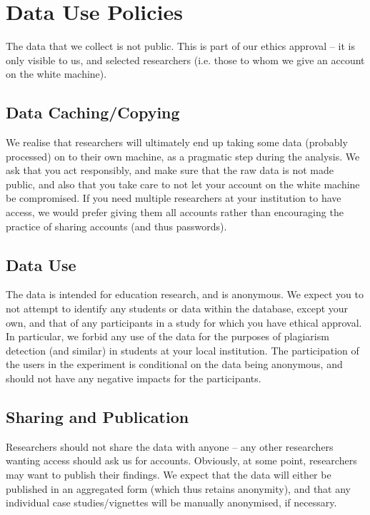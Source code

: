 \documentclass{report}
\begin{document}
\chapter{Data Use Policies}
\label{sec:data_use}

The data that we collect is not public.  This is part of our ethics approval
-- it is only visible to us, and selected researchers (i.e. those to whom we
give an account on the white machine).  

\section{Data Caching/Copying}

We realise that researchers will ultimately end up taking some data (probably
processed) on to their own machine, as a pragmatic step during the analysis.
We ask that you act responsibly, and make sure that the raw data is not made
public, and also that you take care to not let your account on the white
machine be compromised.  If you need multiple researchers at your institution
to have access, we would prefer giving them all accounts rather than
encouraging the practice of sharing accounts (and thus passwords).


\section{Data Use}

The data is intended for education research, and is anonymous.  We expect you
to not attempt to identify any students or data within the database, except
your own, and that of any participants in a study for which you have ethical
approval.  In particular, we forbid any use of the data for the purposes of
plagiarism detection (and similar) in students at your local institution.  The
participation of the users in the experiment is conditional on the data being
anonymous, and should not have any negative impacts for the participants.

\section{Sharing and Publication}

Researchers should not share the data with anyone -- any other researchers
wanting access should ask us for accounts.  Obviously, at some point,
researchers may want to publish their findings.  We expect that the data will
either be published in an aggregated form (which thus retains anonymity), and
that any individual case studies/vignettes will be manually anonymised, if
necessary.
\end{document}
